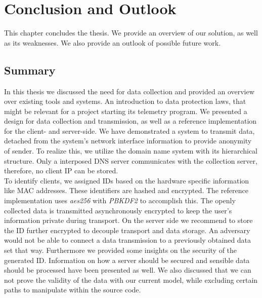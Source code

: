 \chapter{Conclusion and Outlook}
\label{chap:conclusion}
This chapter concludes the thesis. We provide an overview of our solution, as well as its weaknesses.
We also provide an outlook of possible future work. 
\section{Summary}
In this thesis we discussed the need for data collection and provided an overview over existing tools and systems. An introduction to data protection laws, that might be relevant for a project starting its telemetry program. 
We presented a design for data collection and transmission, as well as a reference implementation for the client- and server-side. We have demonstrated a system to transmit data, detached from the system's network interface information to provide anonymity of sender. 
To realize this, we utilize the domain name system with its hierarchical structure. Only a interposed DNS server communicates with the collection server, therefore, no client IP can be stored.\\
To identify clients, we assigned IDs based on the hardware specific information like MAC addresses. These identifiers are hashed and encrypted. The reference implementation uses \textit{aes256} with \textit{PBKDF2} to accomplish this. The openly collected data is transmitted asynchronously encrypted to keep the user's information private during transport.
On the server side we recommend to store the ID further encrypted to decouple transport and data storage. An adversary would not be able to connect a data transmission to a previously obtained data set that way. Furthermore we provided some insights on the security of the generated ID.
Information on how a server should be secured and sensible data should be processed have been presented as well.
We also discussed that we can not prove the validity of the data with our current model, while excluding certain paths to manipulate within the source code.



%


